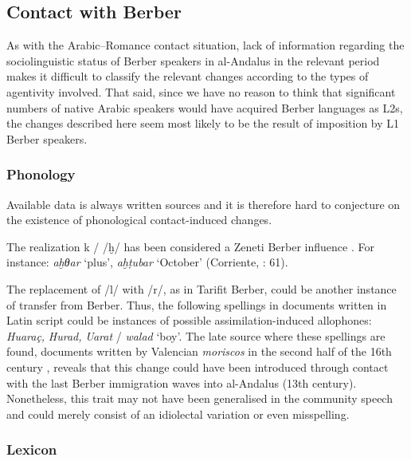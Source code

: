 \documentclass[output=paper,modfonts,nonflat]{langsci/langscibook}
\begin{document}
\subsection{Contact with Berber}

As with the Arabic–Romance contact situation, lack of information regarding the sociolinguistic status of Berber speakers in al-Andalus in the relevant period makes it difficult to classify the relevant changes according to the types of agentivity involved. That said, since we have no reason to think that significant numbers of native Arabic speakers would have acquired Berber languages as L2s, the changes described here seem most likely to be the result of imposition by L1 Berber speakers.

\subsubsection{Phonology}

Available data is always written sources and it is therefore hard to conjecture on the existence of phonological contact-induced changes. 

The realization k / /ḫ/ has been considered a Zeneti Berber influence \citep[7]{Corriente1981}. For instance: \textit{aḫθar} ‘plus’, \textit{aḫṭubar} ‘October’ (Corriente, \citealt{PereiraVicente2015}: 61).  

The replacement of /l/ with /r/, as in Tarifit Berber, could be another instance of transfer from Berber. Thus, the following spellings in documents written in Latin script could be instances of possible assimilation-induced allophones: \textit{Huaraç,} \textit{Hurad,} \textit{Uarat} / \textit{walad} ‘boy’. The late source where these spellings are found, documents written by Valencian \textit{moriscos} in the second half of the 16th century \citep{Labarta1987}, reveals that this change could have been introduced through contact with the last Berber immigration waves into al-Andalus (13th century). Nonetheless, this trait may not have been generalised in the community speech and could merely consist of an idiolectal variation or even misspelling. 

\subsubsection{Lexicon}
\end{document}
